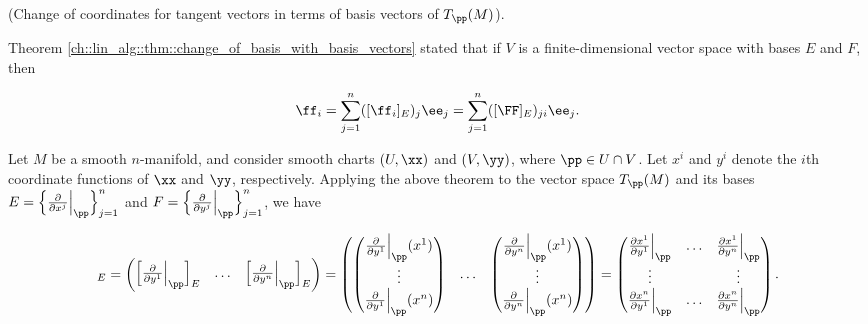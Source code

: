 \begin{theorem}
     (Change of coordinates for tangent vectors in terms of basis vectors of $T_\pp(M)$).

    Theorem \ref{ch::lin_alg::thm::change_of_basis_with_basis_vectors} stated that if $V$ is a finite-dimensional vector space with bases $E$ and $F$, then

    \begin{align*}
        \ff_i = \sum_{j = 1}^n ([\ff_i]_E)_j \ee_j = \sum_{j = 1}^n ([\FF]_E)_{ji} \ee_j.
    \end{align*}

    Let $M$ be a smooth $n$-manifold, and consider smooth charts $(U, \xx)$ and $(V, \yy)$, where $\pp \in U \cap V$. Let $x^i$ and $y^i$ denote the $i$th coordinate functions of $\xx$ and $\yy$, respectively. Applying the above theorem to the vector space $T_\pp(M)$ and its bases $E = \Big\{\frac{\pd}{\pd x^j}\Big|_\pp \Big\}_{j = 1}^n$ and $F = \Big\{\frac{\pd}{\pd y^j}\Big|_\pp \Big\}_{j = 1}^n$, we have
    
    \begin{align*}
        [\FF]_E
        = \begin{pmatrix} \Big[\frac{\pd}{\pd y^1}\Big|_\pp\Big]_E & \hdots & \Big[\frac{\pd}{\pd y^n}\Big|_\pp\Big]_E \end{pmatrix}
        =
        \begin{pmatrix}
            \begin{pmatrix}
                \frac{\pd}{\pd y^1}\Big|_\pp(x^1) \\ \vdots \\ \frac{\pd}{\pd y^1}\Big|_\pp(x^n)
            \end{pmatrix}
            &
            \hdots
            &
            \begin{pmatrix}
                \frac{\pd}{\pd y^n}\Big|_\pp(x^1) \\ \vdots \\ \frac{\pd}{\pd y^n}\Big|_\pp(x^n)
            \end{pmatrix}
        \end{pmatrix}
        =
        \begin{pmatrix}
            \frac{\pd x^1}{\pd y^1}\Big|_\pp & \hdots & \frac{\pd x^1}{\pd y^n}\Big|_\pp \\
            \vdots & & \vdots \\
            \frac{\pd x^n}{\pd y^1}\Big|_\pp & \hdots & \frac{\pd x^n}{\pd y^n}\Big|_\pp
        \end{pmatrix}.
        \end{align*}
    

\end{theorem}
